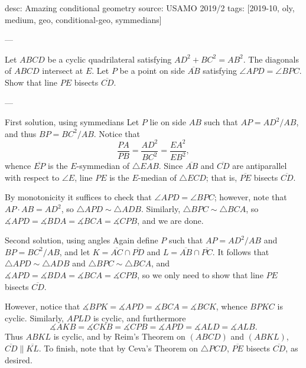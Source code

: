 desc: Amazing conditional geometry
source: USAMO 2019/2
tags: [2019-10, oly, medium, geo, conditional-geo, symmedians]

---

Let $ABCD$ be a cyclic quadrilateral satisfying $AD^2+BC^2=AB^2$. The diagonals of $ABCD$ intersect at $E$. Let $P$ be a point on side $\overline{AB}$ satisfying $\angle APD=\angle BPC$. Show that line $PE$ bisects $\overline{CD}$.

---

\begin{customenv}{First solution, using symmedians}
    Let $P$ lie on side $AB$ such that $AP=AD^2/AB$, and thus $BP=BC^2/AB$. Notice that \[\frac{PA}{PB}=\frac{AD^2}{BC^2}=\frac{EA^2}{EB^2},\]
    whence $\overline{EP}$ is the $E$-symmedian of $\triangle EAB$. Since $\overline{AB}$ and $\overline{CD}$ are antiparallel with respect to $\angle E$, line $PE$ is the $E$-median of $\triangle ECD$; that is, $\overline{PE}$ bisects $\overline{CD}$.

    By monotonicity it suffices to check that $\angle APD=\angle BPC$; however, note that $AP\cdot AB=AD^2$, so $\triangle APD\sim\triangle ADB$. Similarly, $\triangle BPC\sim\triangle BCA$, so $\measuredangle APD=\measuredangle BDA=\measuredangle BCA=\measuredangle CPB$, and we are done. 
\end{customenv}
\begin{customenv}{Second solution, using angles}
    Again define $P$ such that $AP=AD^2/AB$ and $BP=BC^2/AB$, and let $K=\overline{AC}\cap\overline{PD}$ and $L=\overline{AB}\cap\overline{PC}$. It follows that $\triangle APD\sim\triangle ADB$ and $\triangle BPC\sim\triangle BCA$, and $\measuredangle APD=\measuredangle BDA=\measuredangle BCA=\measuredangle CPB$, so we only need to show that line $PE$ bisects $\overline{CD}$.

    However, notice that $\measuredangle BPK=\measuredangle APD=\measuredangle BCA=\measuredangle BCK$, whence $BPKC$ is cyclic. Similarly, $APLD$ is cyclic, and furthermore \[\measuredangle AKB=\measuredangle CKB=\measuredangle CPB=\measuredangle APD=\measuredangle ALD=\measuredangle ALB.\]
    Thus $ABKL$ is cyclic, and by Reim's Theorem on $(ABCD)$ and $(ABKL)$, $\overline{CD}\parallel\overline{KL}$. To finish, note that by Ceva's Theorem on $\triangle PCD$, $\overline{PE}$ bisects $\overline{CD}$, as desired. 
\end{customenv}
